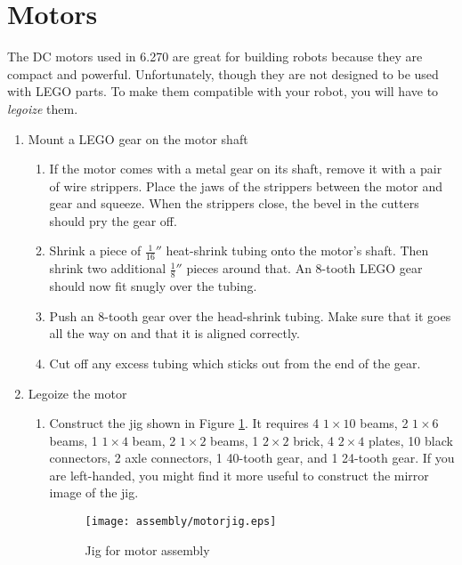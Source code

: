 \section{Motors}

The DC motors used in 6.270 are great for building robots because they
are compact and powerful. Unfortunately, though they are not designed
to be used with LEGO parts. To make them compatible with your robot,
you will have to {\it legoize} them.

\begin{enumerate}

\item Mount a LEGO gear on the motor shaft

\begin{enumerate}

 \item If the motor comes with a metal gear on its shaft, remove it
 with a pair of wire strippers. Place the jaws of the strippers
 between the motor and gear and squeeze. When the strippers close, the
 bevel in the cutters should pry the gear off.

 \item Shrink a piece of $\frac{1}{16}''$ heat-shrink tubing onto the
 motor's shaft. Then shrink two additional $\frac{1}{8}''$ pieces
 around that. An 8-tooth LEGO gear should now fit snugly over the
 tubing.

 \item Push an 8-tooth gear over the head-shrink tubing. Make sure
 that it goes all the way on and that it is aligned correctly.

 \item Cut off any excess tubing which sticks out from the end of the
 gear.

\end{enumerate}

\item Legoize the motor

\begin{enumerate}
 
 \item Construct the jig shown in Figure \ref{motorjig}. It requires 4
 $1\times10$ beams, 2 $1\times6$ beams, 1 $1\times4$ beam, 2 $1\times2$ beams, 1 $2\times2$
 brick, 4 $2\times4$ plates, 10 black connectors, 2 axle connectors, 1
 40-tooth gear, and 1 24-tooth gear. If you are left-handed, you might
 find it more useful to construct the mirror image of the jig.

\begin{figure}[htbp]
\begin{center}
\texttt{[image: assembly/motorjig.eps]}
\caption{Jig for motor assembly}
\label{motorjig}
\end{center}
\end{figure}


\end{enumerate}
\end{enumerate}
